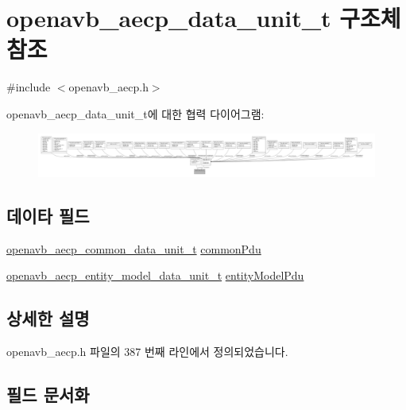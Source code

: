 \hypertarget{structopenavb__aecp__data__unit__t}{}\section{openavb\+\_\+aecp\+\_\+data\+\_\+unit\+\_\+t 구조체 참조}
\label{structopenavb__aecp__data__unit__t}


{\ttfamily \#include $<$openavb\+\_\+aecp.\+h$>$}



openavb\+\_\+aecp\+\_\+data\+\_\+unit\+\_\+t에 대한 협력 다이어그램\+:
\nopagebreak
\begin{figure}[H]
\begin{center}
\leavevmode
\includegraphics[width=350pt]{structopenavb__aecp__data__unit__t__coll__graph}
\end{center}
\end{figure}
\subsection*{데이타 필드}
\begin{DoxyCompactItemize}
\item 
\hyperlink{structopenavb__aecp__common__data__unit__t}{openavb\+\_\+aecp\+\_\+common\+\_\+data\+\_\+unit\+\_\+t} \hyperlink{structopenavb__aecp__data__unit__t_ad6f02622785f0b6f92ab4329f747e01e}{common\+Pdu}
\item 
\hyperlink{structopenavb__aecp__entity__model__data__unit__t}{openavb\+\_\+aecp\+\_\+entity\+\_\+model\+\_\+data\+\_\+unit\+\_\+t} \hyperlink{structopenavb__aecp__data__unit__t_a837e0716e898f24be1096090abd03bd3}{entity\+Model\+Pdu}
\end{DoxyCompactItemize}


\subsection{상세한 설명}


openavb\+\_\+aecp.\+h 파일의 387 번째 라인에서 정의되었습니다.



\subsection{필드 문서화}
